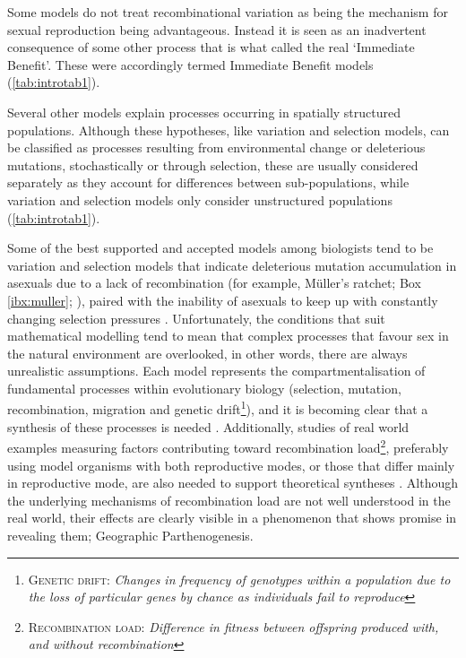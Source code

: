 Some models do not treat recombinational variation as being the mechanism for sexual reproduction being advantageous. Instead it is seen as an inadvertent consequence of some other process that is what \textcite{kondrashov_classification_1993} called the real `Immediate Benefit'. These were accordingly termed Immediate Benefit models (\cref{tab:introtab1}).

Several other models explain processes occurring in spatially structured populations. Although these hypotheses, like variation and selection models, can be classified as processes resulting from environmental change or deleterious mutations, stochastically or through selection, these are usually considered separately \parencite{maynard-smith_evolution_1978,kondrashov_classification_1993} as they account for differences between sub-populations, while variation and selection models only consider unstructured populations (\cref{tab:introtab1}).

Some of the best supported and accepted models among biologists tend to be variation and selection models that indicate deleterious mutation accumulation in asexuals due to a lack of recombination (for example, M\"uller's ratchet; Box \ref{ibx:muller}; \cite{muller_relation_1964}), paired with the inability of asexuals to keep up with constantly changing selection pressures \parencite[for example the Red Queen hypothesis;][]{van_valen_new_1973}. Unfortunately, the conditions that suit mathematical modelling tend to mean that complex processes that favour sex in the natural environment are overlooked, in other words, there are always unrealistic assumptions. Each model represents the compartmentalisation of fundamental processes within evolutionary biology (selection, mutation, recombination, migration and genetic drift\footnote[2]{\textsc{Genetic drift:} \textit{Changes in frequency of genotypes within a population due to the loss of particular genes by chance as individuals fail to reproduce}}), and it is becoming clear that a synthesis of these processes is needed \parencite{west_pluralist_1999,otto_resolving_2002}. Additionally, studies of real world examples measuring factors contributing toward recombination load\footnote[3]{\textsc{Recombination load:} \textit{Difference in fitness between offspring produced with, and without recombination}}, preferably using model organisms with both reproductive modes, or those that differ mainly in reproductive mode, are also needed to support theoretical syntheses \parencite{otto_resolving_2002}. Although the underlying mechanisms of recombination load are not well understood in the real world, their effects are clearly visible in a phenomenon that shows promise in revealing them; Geographic Parthenogenesis.

